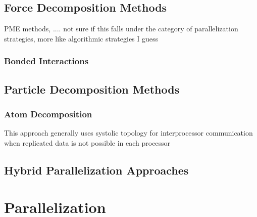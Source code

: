 \documentclass[conference]{IEEEtran}
\begin{document}
    \subsection{Force Decomposition Methods}
    PME methods, .... not sure if this falls under the category of parallelization strategies, more like
    algorithmic strategies I guess

    \subsubsection{Bonded Interactions}
        \subsection{Particle Decomposition Methods}
        \subsubsection{Atom Decomposition}
        This approach generally uses systolic topology for interprocessor communication when replicated data is not 
        possible in each processor

\subsection{Hybrid Parallelization Approaches}

\section{Parallelization}
\end{document}
